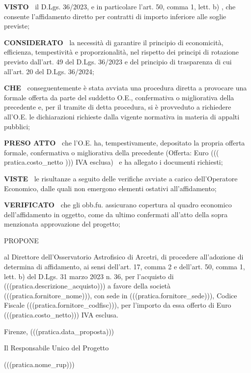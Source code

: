 \textbf{VISTO~}
il D.Lgs. 36/2023, e in particolare l'art. 50, comma 1, lett. b) , che
consente l'affidamento diretto per contratti di importo inferiore alle
soglie previste;


\textbf{CONSIDERATO~}
la necessità di garantire il principio di economicità, efficienza,
tempestività e proporzionalità, nel rispetto dei principi di rotazione
previsto dall'art. 49 del D.Lgs. 36/2023 e del principio di trasparenza
di cui all'art. 20 del D.Lgs. 36/2024;


\textbf{CHE~}
conseguentemente è stata avviata una procedura diretta a provocare una
formale offerta da parte del suddetto O.E., confermativa o migliorativa
della precedente e, per il tramite di detta procedura, si è provveduto
a richiedere all'O.E. le dichiarazioni richieste dalla vigente normativa
in materia di appalti pubblici;


\textbf{PRESO ATTO~}
che l'O.E. ha, tempestivamente, depositato la propria offerta formale,
confermativa o migliorativa
della precedente (Offerta: Euro ((( pratica.costo_netto )))
IVA esclusa)  e ha allegato i documenti richiesti;


\textbf{VISTE~}
le risultanze a seguito delle verifiche avviate a carico dell'Operatore
Economico, dalle quali non emergono elementi ostativi all'affidamento;


\textbf{VERIFICATO~}
che gli obb.fu. assicurano copertura al quadro economico dell'affidamento
in oggetto, come da ultimo confermati all'atto della sopra menzionata
approvazione del progetto;  



\begin{center}
PROPONE
\end{center}

al Direttore dell'Osservatorio Astrofisico di Arcetri, di procedere
all'adozione di determina di affidamento, ai sensi dell'art. 17, comma
2 e dell'art. 50, comma 1, lett. b) del D.Lgs. 31 marzo 2023 n. 36, per
l'acquisto di (((pratica.descrizione_acquisto))) a favore della società
(((pratica.fornitore_nome))), con sede in (((pratica.fornitore_sede))),
Codice Fiscale (((pratica.fornitore_codfisc))), per l'importo da essa
offerto di Euro (((pratica.costo_netto))) IVA esclusa.


Firenze, (((pratica.data_proposta)))

\begin{flushright}
\begin{minipage}[c]{11cm}
\begin{center}
Il Responsabile Unico del Progetto

	(((pratica.nome_rup)))

\end{center}
\end{minipage}
\end{flushright}


